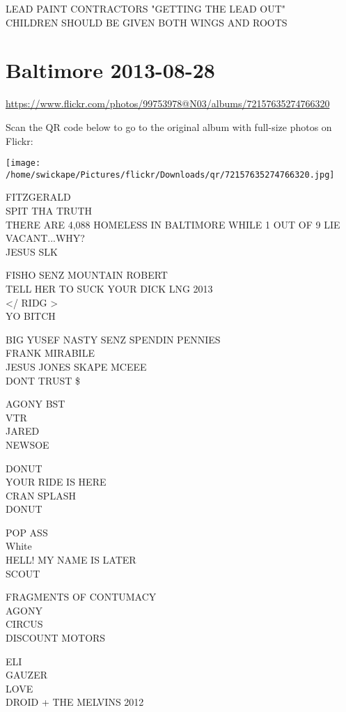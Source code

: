 \documentclass[10pt,letterpaper]{article}
\begin{document}
LEAD PAINT CONTRACTORS "GETTING THE LEAD OUT"\\
CHILDREN SHOULD BE GIVEN BOTH WINGS AND ROOTS


\section*{Baltimore 2013-08-28}

\url{https://www.flickr.com/photos/99753978@N03/albums/72157635274766320}

Scan the QR code below to go to the original album with full-size photos on Flickr:

\texttt{[image: /home/swickape/Pictures/flickr/Downloads/qr/72157635274766320.jpg]}


FITZGERALD\\
SPIT THA TRUTH\\
THERE ARE 4,088 HOMELESS IN BALTIMORE WHILE 1 OUT OF 9 LIE VACANT...WHY?\\
JESUS SLK

FISHO SENZ MOUNTAIN ROBERT\\
TELL HER TO SUCK YOUR DICK LNG 2013\\
</  RIDG >\\
YO BITCH

BIG YUSEF NASTY SENZ SPENDIN PENNIES\\
FRANK MIRABILE\\
JESUS JONES SKAPE MCEEE\\
DONT TRUST \$

AGONY BST\\
VTR\\
JARED\\
NEWSOE

DONUT\\
YOUR RIDE IS HERE\\
CRAN SPLASH\\
DONUT

POP ASS\\
White\\
HELL! MY NAME IS LATER\\
SCOUT

FRAGMENTS OF CONTUMACY\\
AGONY\\
CIRCUS\\
DISCOUNT MOTORS

ELI\\
GAUZER\\
LOVE\\
DROID + THE MELVINS 2012
\end{document}
